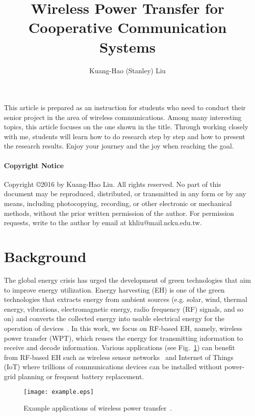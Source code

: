 \documentclass[12pt]{article}%
\begin{document}
\title{Wireless Power Transfer for Cooperative Communication Systems}
\date{}
\author{Kuang-Hao (Stanley) Liu}
\maketitle

This article is prepared as an instruction for students who need to
conduct their senior project in the area of wireless communications.
Among many interesting topics, this article focuses on the one shown
in the title. Through working closely with me, students will learn
how to do research step by step and how to present the research
results. Enjoy your journey and the joy when reaching the goal.

\paragraph{Copyright Notice}
Copyright \copyright 2016 by Kuang-Hao Liu. All rights reserved. No
part of this document may be reproduced, distributed, or transmitted
in any form or by any means, including photocopying, recording, or
other electronic or mechanical methods, without the prior written
permission of the author. For permission requests, write to the
author by email at khliu@mail.ncku.edu.tw.


\section{Background}
The global energy crisis has urged the development of green
technologies that aim to improve energy utilization. Energy
harvesting (EH) is one of the green technologies that extracts
energy from ambient sources (e.g. solar, wind, thermal energy,
vibrations, electromagnetic energy, radio frequency (RF) signals,
and so on) and converts the collected energy into usable electrical
energy for the operation of devices~\cite{Vullers2010}. In this
work, we focus on RF-based EH, namely, wireless power transfer
(WPT), which reuses the energy for transmitting information to
receive and decode information. Various applications (see
Fig.~\ref{fig:example}) can benefit from RF-based EH such as
wireless sensor networks~\cite{Sudevalayam2011} and Internet of
Things (IoT) where trillions of communications devices can be
installed without power-grid planning or frequent battery
replacement.

\begin{figure}[ht]
\centering
\texttt{[image: example.eps]}
\caption{Example applications of wireless power
transfer~\cite{Bi2015}.} \label{fig:example}
\end{figure}
\end{document}
